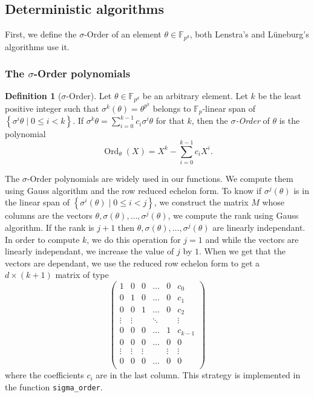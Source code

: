 \documentclass[a4paper,11pt]{article}
\theoremstyle{break}
\theoremstyle{sc}
\theoremstyle{definition}
\newtheorem{defi}[thm]{Definition}
\theoremstyle{remark}
\DeclareMathOperator{\Ord}{Ord}
\begin{document}
\subsection{Deterministic algorithms}

First, we define the $\sigma$-Order of an element
$\theta\in\mathbb{F}_{p^d}$, both Lenstra's and Lüneburg's algorithms use it.

\subsubsection{The $\sigma$-Order polynomials}

\begin{defi}[$\sigma$-Order]
  Let $\theta\in\mathbb{F}_{p^d}$ be an arbitrary element. Let $k$ be the least
  positive integer such that $\sigma^k(\theta)=\theta^{p^k}$ belongs to
  $\mathbb{F}_p$-linear span of $\left\{ \sigma^i\theta\;|\;0\leq i < k
  \right\}$. If $\sigma^k\theta=\sum_{i=0}^{k-1}c_i\sigma^i\theta$ for that
  $k$, then the \emph{$\sigma$-Order} of $\theta$ is the polynomial
  \[
    \Ord_\theta(X)=X^k-\sum_{i=0}^{k-1}c_iX^i.
  \]
\end{defi}
The $\sigma$-Order polynomials are widely used in our functions. We compute
them using Gauss algorithm and the row reduced echelon form. To know if
$\sigma^j(\theta)$ is in the linear span of $\left\{
\sigma^i(\theta)\;|\; 0\leq i <j \right\}$, we construct the matrix $M$ whose columns are the
vectors $\theta, \sigma(\theta), \dots, \sigma^{j}(\theta)$, we compute
the rank using Gauss algorithm. If the rank is $j+1$ then $\theta,
\sigma(\theta), \dots, \sigma^j(\theta)$ are linearly independant. In order to
compute $k$, we do this operation for $j=1$ and while the vectors are linearly
independant, we increase the value of $j$ by $1$. When we get that the
vectors are dependant, we use the reduced row echelon form to get a
$d\times(k+1)$ matrix of type 
\[
\begin{pmatrix}
  1 & 0 & 0 & \dots & 0 & c_0 \\
  0 & 1 & 0 & \dots & 0 & c_1 \\
  0 & 0 & 1 & \dots & 0 & c_2 \\
  \vdots & \vdots & & \ddots & & \vdots \\
  0 & 0 & 0 & \dots & 1 & c_{k-1} \\
  0 & 0 & 0 & \dots & 0 & 0 \\
  \vdots & \vdots & \vdots & & \vdots & \vdots \\
  0 & 0 & 0 & \dots & 0 & 0 \\
\end{pmatrix}
\]
where the coefficients $c_i$ are in the last column. This strategy is
implemented in the function \texttt{sigma\_order}.
  
\end{document}
